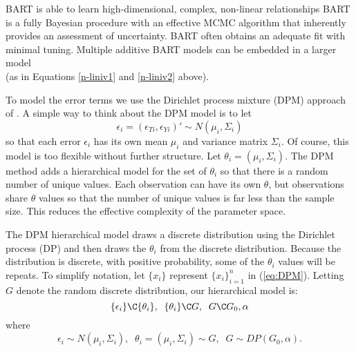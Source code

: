 \bi 
\p BART is able to learn high-dimensional, complex, non-linear
relationships \p BART is a fully Bayesian procedure with an effective
MCMC algorithm that inherently provides an assessment of uncertainty.
\p BART often obtains an adequate fit with minimal tuning. \p Multiple
additive BART models can be embedded in a larger model \\ 
(as in Equations \ref{n-liniv1} and \ref{n-liniv2} above).
\ib


%

To model the error terms we use the Dirichlet process mixture (DPM) approach 
of \cite{EW95}.
A simple way to think about the DPM model is to let
$$
\epsilon_i = (\epsilon_{Ti},\epsilon_{Yi})' \sim N(\mu_i,\Sigma_i)
$$
so that 
each error $\epsilon_i$  has its own mean $\mu_i$ and variance matrix $\Sigma_i$.
Of course, this model
is too flexible without further structure.
Let $\theta_i = (\mu_i,\Sigma_i)$.
The DPM method adds a hierarchical model for the set of  $\theta_i$ so that
there is a random number of unique values.
Each observation can have its own $\theta$, but observations share $\theta$ values
so that the number of unique values is far less than the sample size.
This reduces the effective complexity of the parameter space.

The DPM hierarchical model draws a discrete distribution using the  Dirichlet process (DP)
and then draws the $\theta_i$ from the discrete distribution.  Because the distribution
is discrete, with positive probability, some of the $\theta_i$ values will be repeats.
To simplify notation, let $\{x_i\}$ represent $\{x_i\}_{i=1}^n$ in (\ref{eq:DPM}).
Letting $G$ denote the random discrete distribution, our hierarchical model is:
\begin{equation}\label{eq:DPM}
\{\epsilon_i\} \C \{\theta_i\}, \;\;  \{\theta_i\}\C G, \;\;  G \C G_0,\alpha
\end{equation}
where
$$
\epsilon_i \sim N(\mu_i,\Sigma_i), \;\; \theta_i = (\mu_i,\Sigma_i) \sim G, \;\; G \sim DP(G_0,\alpha).
$$

